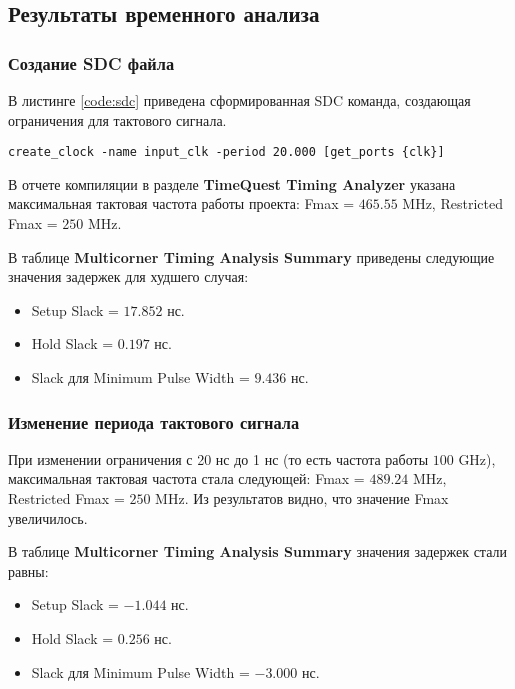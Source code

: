 
\subsection{Результаты временного анализа}

\subsubsection{Создание SDC файла}

В листинге \ref{code:sdc} приведена сформированная SDC команда, создающая ограничения для тактового сигнала.

\begin{lstlisting}[caption=Synopsys Design Constraints (SDC) файл, label=code:sdc]
create_clock -name input_clk -period 20.000 [get_ports {clk}]
\end{lstlisting}

В отчете компиляции в разделе \textbf{TimeQuest Timing Analyzer} указана максимальная тактовая частота работы проекта: Fmax = $465.55$ MHz, Restricted Fmax = $250$ MHz.

В таблице \textbf{Multicorner Timing Analysis Summary} приведены следующие значения задержек для худшего случая:
\begin{itemize}
\setlength\itemsep{0em}
\item Setup Slack = $17.852$ нс.
\item Hold Slack = $0.197$ нс.
\item Slack для Minimum Pulse Width = $9.436$ нс.
\end{itemize}

\subsubsection{Изменение периода тактового сигнала}

При изменении ограничения с 20 нс до 1 нс (то есть частота работы $100$ GHz), максимальная тактовая частота стала следующей: Fmax = $489.24$ MHz, Restricted Fmax = $250$ MHz. Из результатов видно, что значение Fmax увеличилось.

В таблице \textbf{Multicorner Timing Analysis Summary} значения задержек стали равны:
\begin{itemize}
\setlength\itemsep{0em}
\item Setup Slack = $-1.044$ нс.
\item Hold Slack = $0.256$ нс.
\item Slack для Minimum Pulse Width = $-3.000$ нс.
\end{itemize}


